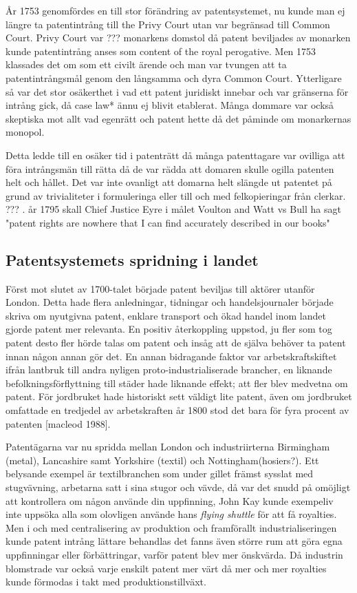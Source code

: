 År 1753 genomfördes en till stor förändring av patentsystemet, nu kunde man ej längre ta patentintrång till the Privy Court utan var begränsad till Common Court. Privy Court var ??? monarkens domstol då patent beviljades av monarken kunde patentintrång anses som content of the royal perogative. Men 1753 klassades det om som ett civilt ärende och man var tvungen att ta patentintrångsmål genom den långsamma och dyra Common Court. Ytterligare så var det stor osäkerthet i vad ett patent juridiskt innebar och var gränserna för intrång gick, då case law* ännu ej blivit etablerat. Många dommare var också skeptiska mot allt vad egenrätt och patent hette då det påminde om monarkernas monopol.

Detta ledde till en osäker tid i patenträtt då många patenttagare var ovilliga att föra intrångsmän till rätta då de var rädda att domaren skulle ogilla patenten helt och hållet. Det var inte ovanligt att domarna helt slängde ut patentet på grund av trivialiteter i formuleringa eller till och med felkopieringar från clerkar. ??? . år 1795 skall Chief Justice Eyre i målet Voulton and Watt vs Bull ha sagt "patent rights are nowhere 
that I can find accurately described in our books"


\subsection{Patentsystemets spridning i landet} %
\label{sub:patentsystemets_spridning_i_landet}

Först mot slutet av 1700-talet började patent beviljas till aktörer utanför London. Detta hade flera anledningar, tidningar och handelsjournaler började skriva om nyutgivna patent, enklare transport och ökad handel inom landet gjorde patent mer relevanta. En positiv återkoppling uppstod, ju fler som tog patent desto fler hörde talas om patent och insåg att de själva behöver ta patent innan någon annan gör det. En annan bidragande faktor var arbetskraftskiftet ifrån lantbruk till andra nyligen proto-industrialiserade brancher, en liknande befolkningsförflyttning till städer hade liknande effekt; att fler blev medvetna om patent. För jordbruket hade historiskt sett väldigt lite patent, även om jordbruket omfattade en tredjedel av arbetskraften år 1800 stod det bara för fyra procent av patenten [macleod 1988].

Patentägarna var nu spridda mellan London och industriirterna Birmingham (metal), Lancashire samt Yorkshire (textil) och Nottingham(hosiers?). Ett belysande exempel är textilbranchen som under gillet främst sysslat med stugvävning, arbetarna satt i sina stugor och vävde, då var det snudd på omöjligt att kontrollera om någon använde din uppfinning, John Kay kunde exempeliv inte uppsöka alla som olovligen använde hans \emph{flying shuttle} för att få royalties. Men i och med centralisering av produktion och framförallt industrialiseringen kunde patent intrång lättare behandlas det fanns även större rum att göra egna uppfinningar eller förbättringar, varför patent blev mer önskvärda. Då industrin blomstrade var också varje enskilt patent mer värt då mer och mer royalties kunde förmodas i takt med produktionstillväxt.

